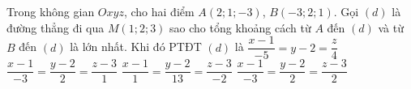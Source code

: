 \begin{ex}%
Trong không gian $Ox y z$, cho hai điểm $A(2; 1;-3)$, $B(-3; 2; 1)$. Gọi $(d)$ là đường thẳng đi qua $M(1; 2; 3)$ sao cho tổng khoảng cách từ $A$ đến $(d)$ và từ $B$ đến $(d)$ là lớn nhất. Khi đó PTĐT $(d)$ là
	\choice
	{$\dfrac{x-1}{-5}=y-2=\dfrac{z}{4}$}
	{$\dfrac{x-1}{-3}=\dfrac{y-2}{2}=\dfrac{z-3}{1}$}
	{\True $\dfrac{x-1}{1}=\dfrac{y-2}{13}=\dfrac{z-3}{-2}$}
	{$\dfrac{x-1}{-3}=\dfrac{y-2}{2}=\dfrac{z-3}{2}$}
\end{ex}
